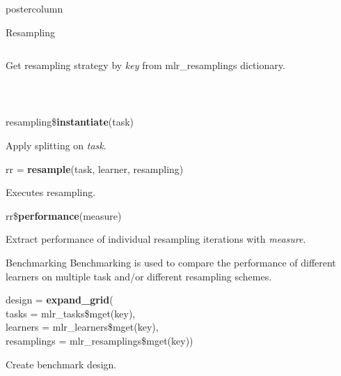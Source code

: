 \documentclass{beamer}
\begin{document}
\begin{frame}[fragile]{}
\begin{columns}
\begin{column}{.245\textwidth}
\begin{beamercolorbox}[center]{postercolumn}
\begin{minipage}{.98\textwidth}
{\begin{myblock}{Resampling}
\begin{minipage}{\textwidth}
\begin{columns}[T]
\begin{column}{0.8\textwidth}
\begin{codebox}
										  \end{codebox}
										  \hspace*{1ex}Get resampling strategy by \textit{key} from mlr\_resamplings \hspace*{1ex}dictionary.
								    \end{column}
							     \end{columns}
					      	\end{minipage}
						      \\[\baselineskip]
						      \begin{codebox}
							      resampling\$\textbf{instantiate}(task)
						      \end{codebox}
						      \hspace*{1ex}Apply splitting on \textit{task}.
						      \\
					      	\begin{codebox}
							      rr = \textbf{resample}(task, learner, resampling)
						      \end{codebox}
						      \hspace*{1ex}Executes resampling.
						      \\
						      \begin{codebox}
							      rr\$\textbf{performance}(measure)
						      \end{codebox}
						      \hspace*{1ex}Extract performance of individual resampling iterations with \textit{measure}.
					      \end{myblock}
				        \begin{myblock}{Benchmarking}
						      Benchmarking is used to compare the performance of different learners on multiple task and/or different resampling schemes.
						    \\
						      \begin{codeboxmultiline}[width=21.95cm]
							      design = \textbf{expand\_grid}(\\
							      \hspace*{1ex}tasks = mlr\_tasks\$mget(key),\\
							      \hspace*{1ex}learners = mlr\_learners\$mget(key),\\
							      \hspace*{1ex}resamplings = mlr\_resamplings\$mget(key))
						      \end{codeboxmultiline}
						      \hspace*{1ex}Create benchmark design.

\end{myblock}}
\end{minipage}
\end{beamercolorbox}
\end{column}
\end{columns}
\end{frame}
\end{document}
